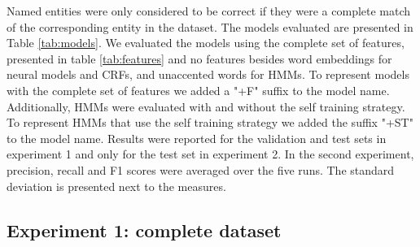 \documentclass[sigconf]{acmart}
\begin{document}
Named entities were only considered to be correct if they were a complete match of the 
corresponding entity in the dataset. The models evaluated are presented in Table \ref{tab:models}.
We evaluated the models using the complete set of features, presented in 
table \ref{tab:features} and no features besides word embeddings for neural models and
CRFs, and unaccented words for HMMs. To represent models with the complete set of features
we added a "+F" suffix to the model name. Additionally, HMMs were evaluated with and
without the self training strategy. To represent HMMs that use the self training strategy
we added the suffix "+ST" to the model name.
Results were reported for the validation and test sets in experiment 1 and only for the
test set in experiment 2. In the second experiment, precision, recall and F1 scores were 
averaged over the five runs. The standard deviation is presented next to the measures.

\subsection{Experiment 1: complete dataset}
\end{document}
